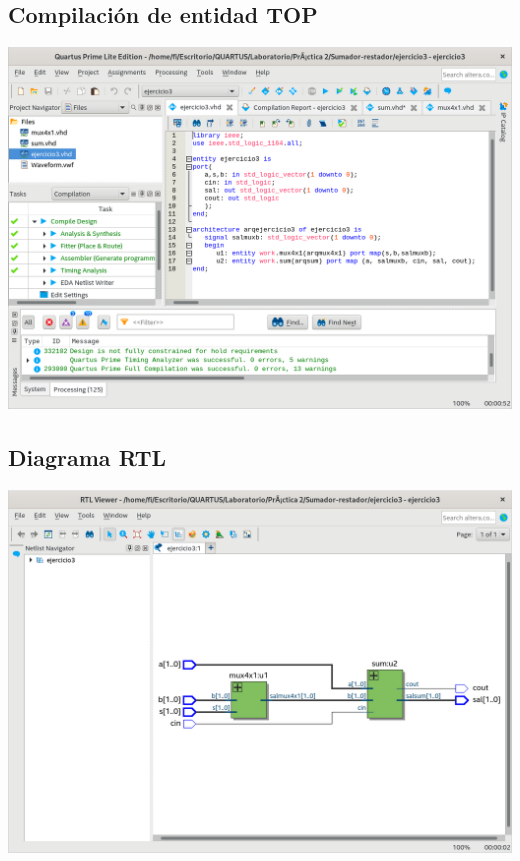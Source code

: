 \documentclass[10pt,a4paper]{article}
\begin{document}
	\subsection{Compilación de entidad TOP}
	\begin{center}
		\includegraphics[scale=0.35]{Top.png}
	\end{center}
	
	\subsection{Diagrama RTL}
	\begin{center}
		\includegraphics[scale=0.35]{RTL.png}
	\end{center}
	
\end{document}

